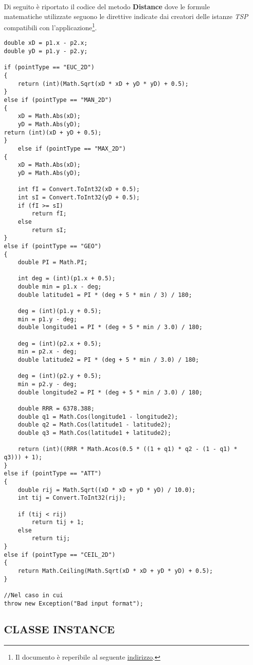 \documentclass[11pt]{article}
\begin{document}
Di seguito è riportato il codice del metodo \textbf{Distance} dove le formule matematiche utilizzate seguono le direttive indicate dai creatori delle istanze \textit{TSP} compatibili con l'applicazione\footnote{Il documento è reperibile al seguente \href{https://www.iwr.uni-heidelberg.de/groups/comopt/software/TSPLIB95/tsp95.pdf}{indirizzo}.}.

\begin{lstlisting}
double xD = p1.x - p2.x;
double yD = p1.y - p2.y;

if (pointType == "EUC_2D")
{
    return (int)(Math.Sqrt(xD * xD + yD * yD) + 0.5);
}
else if (pointType == "MAN_2D")
{
    xD = Math.Abs(xD);
    yD = Math.Abs(yD);
return (int)(xD + yD + 0.5);
}
    else if (pointType == "MAX_2D")
{
    xD = Math.Abs(xD);
    yD = Math.Abs(yD);

    int fI = Convert.ToInt32(xD + 0.5);
    int sI = Convert.ToInt32(yD + 0.5);
    if (fI >= sI)
        return fI;
    else
        return sI;
}
else if (pointType == "GEO")
{
    double PI = Math.PI;

    int deg = (int)(p1.x + 0.5);
    double min = p1.x - deg;
    double latitude1 = PI * (deg + 5 * min / 3) / 180;

    deg = (int)(p1.y + 0.5);
    min = p1.y - deg;
    double longitude1 = PI * (deg + 5 * min / 3.0) / 180;

    deg = (int)(p2.x + 0.5);
    min = p2.x - deg;
    double latitude2 = PI * (deg + 5 * min / 3.0) / 180;
    
    deg = (int)(p2.y + 0.5);
    min = p2.y - deg;
    double longitude2 = PI * (deg + 5 * min / 3.0) / 180;
    
    double RRR = 6378.388;
    double q1 = Math.Cos(longitude1 - longitude2);
    double q2 = Math.Cos(latitude1 - latitude2);
    double q3 = Math.Cos(latitude1 + latitude2);
    
    return (int)((RRR * Math.Acos(0.5 * ((1 + q1) * q2 - (1 - q1) * q3))) + 1);
}
else if (pointType == "ATT")
{
    double rij = Math.Sqrt((xD * xD + yD * yD) / 10.0);
    int tij = Convert.ToInt32(rij);

    if (tij < rij)
        return tij + 1;
    else
        return tij;
}
else if (pointType == "CEIL_2D")
{
    return Math.Ceiling(Math.Sqrt(xD * xD + yD * yD) + 0.5);
}

//Nel caso in cui 
throw new Exception("Bad input format");
\end{lstlisting}

\subsection*{CLASSE INSTANCE}
\label{sec:ClasseInstanceS}
\end{document}
